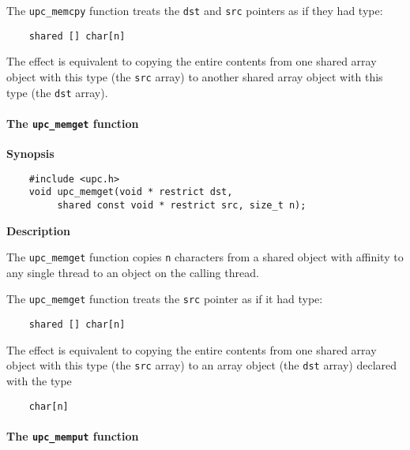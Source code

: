 \np The {\tt upc\_memcpy} function treats the {\tt dst} and
   {\tt src} pointers as if they had type:

\begin{verbatim}
    shared [] char[n] 
\end{verbatim}

   The effect is equivalent to copying the entire contents from one
   shared array object with this type (the {\tt src} array) to another shared
   array object with this type (the {\tt dst} array).


\paragraph{The {\tt upc\_memget} function}

{\bf Synopsis} 

\npf\vspace{-2.5em}
\begin{verbatim}
    #include <upc.h> 
    void upc_memget(void * restrict dst, 
         shared const void * restrict src, size_t n); 
\end{verbatim}

{\bf Description}

\np The {\tt upc\_memget} function copies {\tt n} characters from a
   shared object with affinity to any single thread to an object on the calling thread.

\np The {\tt upc\_memget} function treats the {\tt src}
   pointer as if it had type:

\begin{verbatim}
    shared [] char[n] 
\end{verbatim}

   The effect is equivalent to copying the entire contents from one
   shared array object with this type (the {\tt src} array) to an array
   object (the {\tt dst} array) declared with the type

\begin{verbatim}
    char[n] 
\end{verbatim}


\paragraph{The {\tt upc\_memput} function}

